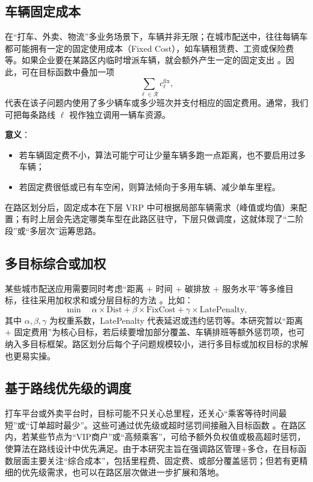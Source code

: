 \documentclass[12pt,a4paper,twoside]{ctexbook}
\begin{document}
\subsection{车辆固定成本}
在“打车、外卖、物流”多业务场景下，车辆并非无限；在城市配送中，往往每辆车都可能拥有一定的固定使用成本（Fixed Cost），如车辆租赁费、工资或保险费等。如果企业要在某路区内临时增派车辆，就会额外产生一定的固定支出 \cite{salazaraguilar2013multi}。因此，可在目标函数中叠加一项
\[
\sum_{\ell \in \mathcal{R}} c^\mathrm{fix}_{\ell},
\]
代表在该子问题内使用了多少辆车或多少班次并支付相应的固定费用。通常，我们可把每条路线 $\ell$ 视作独立调用一辆车资源。

\textbf{意义}：
\begin{itemize}
    \item 若车辆固定费不小，算法可能宁可让少量车辆多跑一点距离，也不要启用过多车辆；
    \item 若固定费很低或已有车空闲，则算法倾向于多用车辆、减少单车里程。
\end{itemize}

在路区划分后，固定成本在下层 VRP 中可根据局部车辆需求（峰值或均值）来配置；有时上层会先选定哪类车型在此路区驻守，下层只做调度，这就体现了“二阶段”或“多层次”运筹思路。

\subsection{多目标综合或加权}
某些城市配送应用需要同时考虑“距离 + 时间 + 碳排放 + 服务水平”等多维目标，往往采用加权求和或分层目标的方法 \cite{toth2014vehicle}。比如：
\[
\min \quad \alpha \times \text{Dist} + \beta \times \text{FixCost} + \gamma \times \text{LatePenalty},
\]
其中 $\alpha, \beta, \gamma$ 为权重系数，LatePenalty 代表延迟或违约惩罚等。本研究暂以“距离 + 固定费用”为核心目标，若后续要增加部分覆盖、车辆排班等额外惩罚项，也可纳入多目标框架。路区划分后每个子问题规模较小，进行多目标或加权目标的求解也更易实操。

\subsection{基于路线优先级的调度}
打车平台或外卖平台时，目标可能不只关心总里程，还关心“乘客等待时间最短”或“订单超时最少”。这些可通过优先级或超时惩罚间接融入目标函数 \cite{salazaraguilar2013multi}。在路区内，若某些节点为“VIP商户”或“高频乘客”，可给予额外负权值或极高超时惩罚，使算法在路线设计中优先满足。由于本研究主旨在强调路区管理+多仓，在目标函数层面主要关注“综合成本”，包括里程费、固定费、或部分覆盖惩罚；但若有更精细的优先级需求，也可以在路区层次做进一步扩展和落地。
\end{document}

